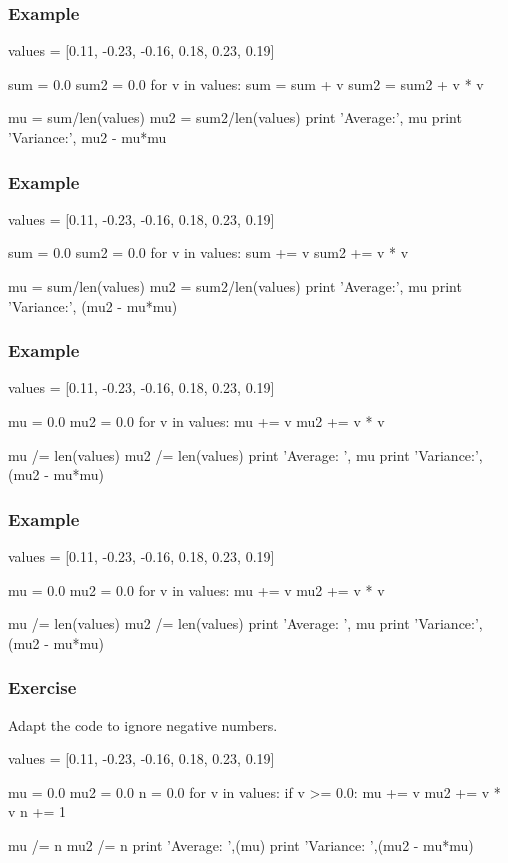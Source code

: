 \begin{frame}[fragile]
\frametitle{Example}

\begin{python}
values = [0.11, -0.23, -0.16, 0.18, 0.23, 0.19]

sum = 0.0
sum2 = 0.0
for v in values:
    sum = sum + v
    sum2 = sum2 + v * v

mu = sum/len(values)
mu2 = sum2/len(values)
print 'Average:', mu
print 'Variance:', mu2 - mu*mu
\end{python}
\end{frame}

\begin{frame}[fragile]
\frametitle{Example}

\begin{python}
values = [0.11, -0.23, -0.16, 0.18, 0.23, 0.19]

sum = 0.0
sum2 = 0.0
for v in values:
    sum += v
    sum2 += v * v

mu = sum/len(values)
mu2 = sum2/len(values)
print 'Average:', mu
print 'Variance:', (mu2 - mu*mu)
\end{python}
\end{frame}

\begin{frame}[fragile]
\frametitle{Example}

\begin{python}
values = [0.11, -0.23, -0.16, 0.18, 0.23, 0.19]

mu = 0.0
mu2 = 0.0
for v in values:
    mu += v
    mu2 += v * v

mu /= len(values)
mu2 /= len(values)
print 'Average: ', mu
print 'Variance:', (mu2 - mu*mu)
\end{python}
\end{frame}

\begin{frame}[fragile]
\frametitle{Example}

\begin{python}
values = [0.11, -0.23, -0.16, 0.18, 0.23, 0.19]

mu = 0.0
mu2 = 0.0
for v in values:
    mu += v
    mu2 += v * v

mu /= len(values)
mu2 /= len(values)
print 'Average: ', mu
print 'Variance:', (mu2 - mu*mu)
\end{python}
\end{frame}

\begin{frame}[fragile]
\frametitle{Exercise}

Adapt the code to ignore negative numbers.

\pause

\begin{python}
values = [0.11, -0.23, -0.16, 0.18, 0.23, 0.19]

mu = 0.0
mu2 = 0.0
n = 0.0
for v in values:
    if v >= 0.0:
        mu += v
        mu2 += v * v
        n += 1

mu /= n
mu2 /= n
print 'Average: ',(mu)
print 'Variance: ',(mu2 - mu*mu)
\end{python}

\end{frame}

